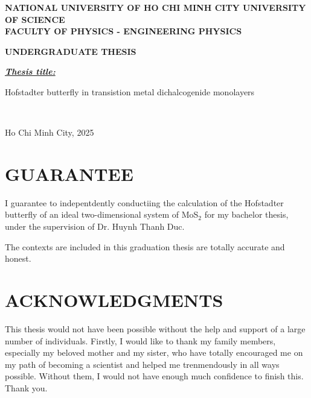 \documentclass{report}
\newcommand{\thesistitlee}{Hofstadter butterfly in transistion metal dichalcogenide monolayers}
\newcommand{\address}{NATIONAL UNIVERSITY OF HO CHI MINH CITY UNIVERSITY OF SCIENCE}
\newcommand{\department}{FACULTY OF PHYSICS - ENGINEERING PHYSICS}
\newcommand{\graddate}{Ho Chi Minh City, 2025}
\begin{document}
\begin{titlepage}
	\begin{center}
		{\bfseries

		{\large {\bf \address}}\\
		{{\textbf{\department}}}\\
		\vspace{2.5cm}

		{\large {\bf UNDERGRADUATE THESIS}}\\
		\vspace{3.0cm}

		}

	\end{center}
	\textit{\textbf{\underline{Thesis title:}}}\\
	\begin{center}
		{\bfseries

			{\largerrr\thesistitlee}
			\vspace{1in}

		}
	\end{center}
	\noindent
	\makebox[\textwidth]{\hfill\makebox[3in]{\hrulefill}}\\
	\begin{center}
	\end{center}
	\begin{center}
		\vspace{2.5in}
		{\graddate}
	\end{center}
\end{titlepage}

\newpage
{}
\pagestyle{fancy}
\renewcommand{\headrulewidth}{0pt}
\fancyhf{}
\fancyfoot[C]{\hspace{0cm} \thepage}
\setcounter{page}{1}

\chapter*{GUARANTEE}
I guarantee to indepentdently conductiing the calculation of the Hofstadter butterfly of an ideal two-dimensional system of MoS$_{2}$ for my bachelor thesis, under the supervision of Dr. Huynh Thanh Duc.

The contexts are included in this graduation thesis are totally accurate and honest.



\chapter*{ACKNOWLEDGMENTS}
This thesis would not have been possible without the help and support of a large number of individuals. Firstly, I would like to thank my family members, especially my beloved mother and my sister, who have totally encouraged me on my path of becoming a scientist and helped me trenmendously in all ways possible. Without them, I would not have enough much confidence to finish this. Thank you.
\end{document}
